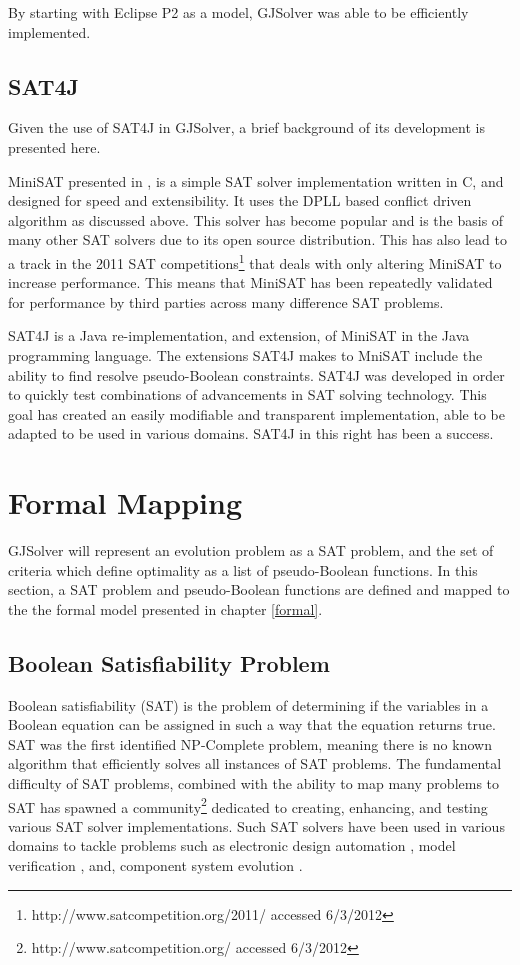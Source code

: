 By starting with Eclipse P2 as a model, GJSolver was able to be efficiently implemented.

\subsection{SAT4J}
Given the use of SAT4J in GJSolver, a brief background of its development is presented here.

MiniSAT presented in \citep{een2003}, is a simple SAT solver implementation written in C, and designed for speed and extensibility.
It uses the DPLL based conflict driven algorithm as discussed above.
This solver has become popular and is the basis of many other SAT solvers due to its open source distribution.
This has also lead to a track in the 2011 SAT competitions\footnote{http://www.satcompetition.org/2011/ accessed 6/3/2012} that deals with only altering MiniSAT to increase performance.
This means that MiniSAT has been repeatedly validated for performance by third parties across many difference SAT problems. 

SAT4J \citep{le2010sat4j} is a Java re-implementation, and extension, of MiniSAT in the Java programming language.
The extensions SAT4J makes to MniSAT include the ability to find resolve pseudo-Boolean constraints.
SAT4J was developed in order to quickly test combinations of advancements in SAT solving technology.
This goal has created an easily modifiable and transparent implementation, able to be adapted to be used in various domains.
SAT4J in this right has been a success.

\section{Formal Mapping}
\label{impl.mapping}
GJSolver will represent an evolution problem as a SAT problem, and the set of criteria which define optimality as a list of pseudo-Boolean functions.
In this section, a SAT problem and pseudo-Boolean functions are defined and mapped to the the formal model presented in chapter \ref{formal}. 

\subsection{Boolean Satisfiability Problem}
Boolean satisfiability (SAT) is the problem of determining if the variables in a Boolean equation can be assigned in such a way that the equation returns true.
SAT was the first identified NP-Complete problem, meaning there is no known algorithm that efficiently solves all instances of SAT problems.
The fundamental difficulty of SAT problems, 
combined with the ability to map many problems to SAT has spawned a community\footnote{http://www.satcompetition.org/ accessed 6/3/2012} 
dedicated to creating, enhancing, and testing various SAT solver implementations. 
Such SAT solvers have been used in various domains to tackle problems such as electronic design automation \citep{Marques-Silva2000}, 
model verification \citep{dennis2006}, and, component system evolution \citep{leBerre2010}.


